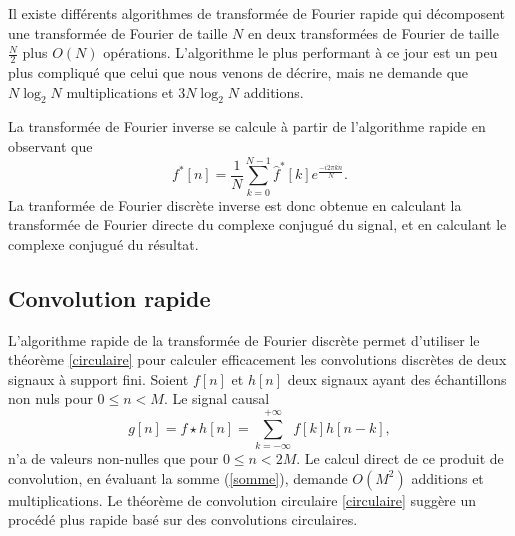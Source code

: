 Il existe diff\'erents algorithmes de transform\'ee de Fourier
rapide qui d\'ecomposent une transform\'ee de Fourier
de taille $N$ en deux transform\'ees de Fourier de taille ${\frac N 2}$
plus $O(N)$ op\'erations. L'algorithme le plus performant \`a ce
jour est un peu plus compliqu\'e que celui que nous venons de
d\'ecrire, mais ne demande que $N \log_2 N$ multiplications
et $3N \log_2 N$ additions.

La transform\'ee de Fourier inverse se calcule \`a partir
de l'algorithme rapide en observant que
\begin{equation}
f^*[n] = \frac 1 N \sum_ {k=0}^ {N-1}  \hat f^*[k]
e^{\frac {-i 2 \pi kn} N} .
\end{equation}
La tranform\'ee de Fourier discr\`ete inverse est donc obtenue en
calculant la transform\'ee de Fourier directe du complexe conjugu\'e
du signal, et en calculant le complexe conjugu\'e du r\'esultat.


\subsection{Convolution rapide}
\label{convol-rap-sec}

L'algorithme rapide de la transform\'ee de Fourier
discr\`ete permet d'utiliser le th\'eor\`eme \ref{circulaire} pour
calculer efficacement les convolutions discr\`etes de
deux signaux \`a support fini.
Soient $f[n]$ et $h[n]$ deux signaux ayant
des \'echantillons non nuls pour $0 \leq n < M$.
Le signal causal
\begin{equation}
\label{somme}
g[n] = f \star h [n] = \sum_{k=- \infty}^{+ \infty} f[k] h [n-k] ,
\end{equation}
n'a de valeurs non-nulles que pour $0 \leq n < 2M$.
Le calcul direct de ce produit
de convolution, en \'evaluant la somme (\ref{somme}), demande
$O(M^2)$ additions et multiplications.
Le th\'eor\`eme de convolution circulaire \ref{circulaire}
sugg\`ere un proc\'ed\'e plus rapide
bas\'e sur des convolutions circulaires.

